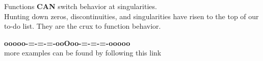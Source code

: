 \documentclass{ximera}
\begin{document}
Functions \textbf{\textcolor{red!80!black}{CAN}} switch behavior at singularities. \\




Hunting down zeros, discontinuities, and singularities have risen to the top of our to-do list.  They are the crux to function behavior. \\
































\begin{center}
\textbf{\textcolor{green!50!black}{ooooo-=-=-=-ooOoo-=-=-=-ooooo}} \\

more examples can be found by following this link\\ 

\end{center}
\end{document}
